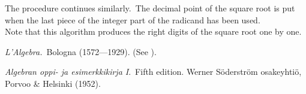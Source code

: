 \documentclass[12pt]{article}
\theoremstyle{definition}
\begin{document}
The procedure continues similarly.\, The decimal point of the square root is put when the last piece of the integer part of the radicand has been used.\\

Note that this algorithm produces the right digits of the square root one by one.


\begin{thebibliography}{9}

 \emph{L'Algebra.}\, Bologna (1572---1929). (See ).

  \emph{Algebran oppi- ja esimerkkikirja I}.\, Fifth edition.  Werner S\"oderstr\"om osakeyhti\"o, Porvoo \& Helsinki (1952).

\end{thebibliography}


\end{document}
